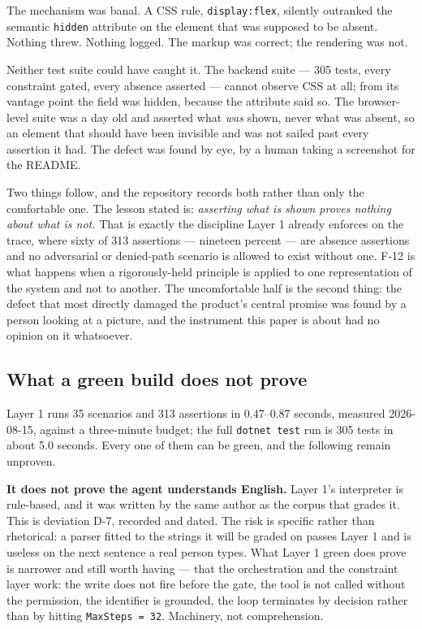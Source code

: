 \documentclass[11pt,a4paper]{article}
\begin{document}
The mechanism was banal. A CSS rule, \texttt{display:flex}, silently outranked
the semantic \texttt{hidden} attribute on the element that was supposed to be
absent. Nothing threw. Nothing logged. The markup was correct; the rendering was
not.

Neither test suite could have caught it. The backend suite --- 305 tests, every
constraint gated, every absence asserted --- cannot observe CSS at all; from its
vantage point the field was hidden, because the attribute said so. The
browser-level suite was a day old and asserted what \emph{was} shown, never what
was absent, so an element that should have been invisible and was not sailed
past every assertion it had. The defect was found by eye, by a human taking a
screenshot for the README.

Two things follow, and the repository records both rather than only the
comfortable one. The lesson stated is: \emph{asserting what is shown proves
nothing about what is not.} That is exactly the discipline Layer 1 already
enforces on the trace, where sixty of 313 assertions --- nineteen percent ---
are absence assertions and no adversarial or denied-path scenario is allowed to
exist without one. F-12 is what happens when a rigorously-held principle is
applied to one representation of the system and not to another. The
uncomfortable half is the second thing: the defect that most directly damaged
the product's central promise was found by a person looking at a picture, and
the instrument this paper is about had no opinion on it whatsoever.

\subsection{What a green build does not prove}

Layer 1 runs 35 scenarios and 313 assertions in 0.47--0.87 seconds, measured
2026-08-15, against a three-minute budget; the full \texttt{dotnet test} run is
305 tests in about 5.0 seconds. Every one of them can be green, and the
following remain unproven.

\textbf{It does not prove the agent understands English.} Layer 1's
interpreter is rule-based, and it was written by the same author as the corpus
that grades it. This is deviation D-7, recorded and dated. The risk is specific
rather than rhetorical: a parser fitted to the strings it will be graded on
passes Layer 1 and is useless on the next sentence a real person types. What
Layer 1 green does prove is narrower and still worth having --- that the
orchestration and the constraint layer work: the write does not fire before the
gate, the tool is not called without the permission, the identifier is grounded,
the loop terminates by decision rather than by hitting \texttt{MaxSteps = 32}.
Machinery, not comprehension.
\end{document}
